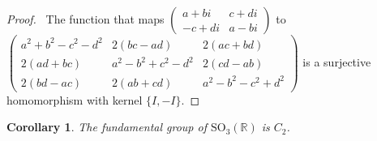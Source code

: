 \documentclass{book}
\let\qed\relax
\newtheorem{cor}{Corollary}[prop]
\theoremstyle{definition}
\begin{document}
\begin{proof}
\pf\ The function that maps $\left( \begin{array}{cc}
a + b i & c + d i \\
-c + di & a - bi
\end{array} \right)$ to $\left( \begin{array}{ccc}
a^2 + b^2 - c^2 - d^2 & 2(bc - ad) & 2(ac + bd) \\
2(ad + bc) & a^2 - b^2 + c^2 - d^2 & 2(cd - ab) \\
2(bd - ac) & 2(ab + cd) & a^2 - b^2 - c^2 + d^2
\end{array} \right)$ is a surjective homomorphism with kernel $\{ I, -I \}$. \qed
\end{proof}

\begin{cor}
The fundamental group of $\mathrm{SO}_3(\mathbb{R})$ is $C_2$.
\end{cor}

\end{document}
